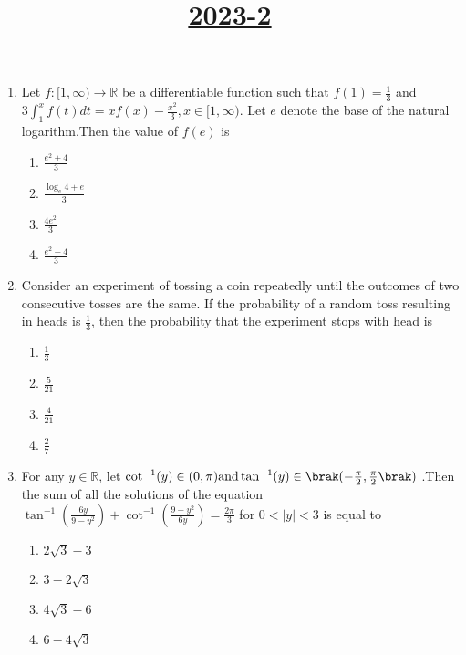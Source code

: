 \documentclass[12pt,a4paper]{article}
\begin{document}
\title{\underline{\textbf{2023-2}}}      \date{}\maketitle                    

\begin{enumerate}
\item Let $f :[1, \infty) \to \mathbb{R}$ be a differentiable function such that $f(1) = \frac{1}{3}$ and $3 \int_{1}^{x}  f(t) dt = x f(x) - \frac{x^2}{3},x \in [1, \infty).$ Let $e$ denote the base of the natural logarithm.Then the value of $f(e)$ is\\
\begin{enumerate}[label=\Alph*.]
\item $\frac{e^2+4}{3}$
\item $\frac{\log_{e}{4} + e}{3}$
\item $\frac{4e^2}{3}$
\item $\frac{e^2-4}{3}$
\end{enumerate}

\item Consider an experiment of tossing a coin repeatedly until the outcomes of two consecutive tosses are the same. If the probability of a random toss resulting in heads is $\frac{1}{3}$, then the probability that the experiment stops with head is\\
\begin{enumerate}
\item $\frac{1}{3}$                             \item $\frac{5}{21}$                            \item $\frac{4}{21}$
\item $\frac{2}{7}$
\end{enumerate}

\item For any $y \in \mathbb{R}$, let $\cot^{-1}(y) \in (0, \pi) \text{and} \tan^{-1}(y) \in \brak( -\frac{\pi}{2}, \frac{\pi}{2} \brak)$ .Then the sum of all the solutions of the equation $\tan^{-1}(\frac{6y}{9-y^2}) + \cot^{-1}(\frac{9-y^2}{6y}) =\frac{2\pi}{3}$ for $0 < |y| < 3$ is equal to\\
\begin{enumerate}
\item $2\sqrt{3}-3$
\item $3 - 2\sqrt{3}$
\item $4\sqrt{3} - 6$
\item $6-4\sqrt{3}$
\end{enumerate}



\end{enumerate}
\end{document}
